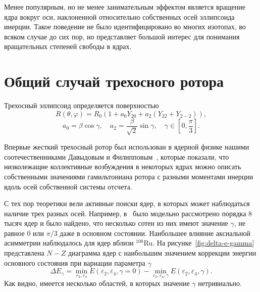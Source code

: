 \documentclass[a4paper, 10pt, twocolumn]{article}
\def\eps{\varepsilon}
\let\phi\varphi
\begin{document}
Менее популярным, но не менее занимательным эффектом является вращение 
ядра вокруг оси, наклоненной относительно собственных осей эллипсоида 
инерции. Такое поведение не было идентифицировано во многих изотопах, во 
всяком случае до сих пор, но представляет большой интерес для понимания 
вращательных степеней свободы в ядрах.


\section{Общий случай трехосного ротора}%

Трехосный эллипсоид определяется поверхностью
$$ R(\theta, \phi) = R_0 \left(1 + a_0 Y_{20} + a_2(Y_{22} + Y_{2-2})\right), $$
$$ a_0 = \beta\cos\gamma, \quad a_2 = \frac{\beta}{\sqrt{2}}\sin\gamma, \quad \gamma \in \left[0, \frac{\pi}{3}\right]. $$

Впервые жесткий трехосный ротор был использован в ядерной физике нашими 
соотечественниками Давыдовым и Филипповым~\cite{first-use}, которые 
показали, что низколежащие коллективные возбуждения в некоторых ядрах 
можно описать собственными значениями гамильтониана ротора с разными 
моментами инерции вдоль осей собственной системы отсчета.

С тех пор теоретики вели активные поиски ядер, в которых может 
наблюдаться наличие трех разных осей. Например, в~\cite{gs3} было 
модельно рассмотрено порядка 8 тысяч ядер и было найдено, что несколько 
сотен из них имеют значение $\gamma$, не равное $0$ или $\pi/3$ даже 
в основном состоянии. Наибольшее влияние аксиальной асимметрии 
наблюдалось для ядер вблизи $^{108}$Ru. На 
рисунке~\ref{fig:delta-e-gamma} представлена $N-Z$ диаграмма ядер 
с наибольшим значением коррекции энергии основного состояния при 
вариации параметра $\gamma$
$$\Delta E_\gamma = \min_{\eps_2,\eps_4} E(\eps_2, \eps_4, \gamma=0)
  - \min_{\eps_2, \eps_4, \gamma} E(\eps_2, \eps_4, \gamma).$$
Как видно, имеется несколько областей, в которых значение $\gamma$ 
нетривиально.
\end{document}
